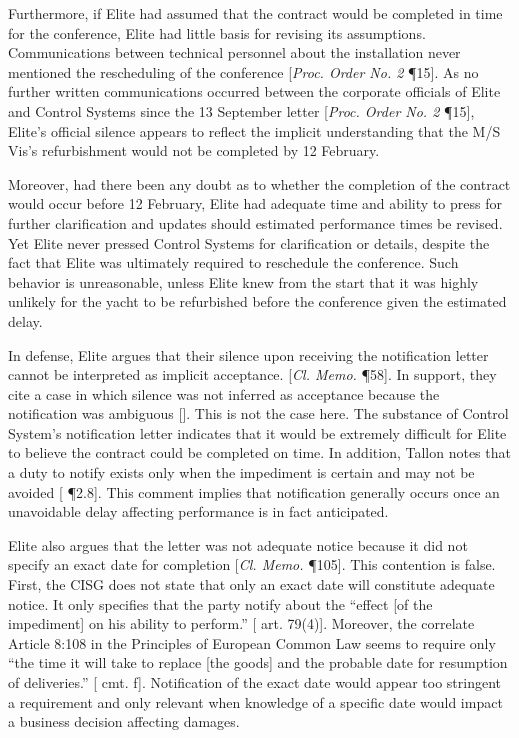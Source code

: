 Furthermore, if Elite had assumed that the contract would be completed in time for the conference, Elite had little basis for revising its assumptions. Communications between technical personnel about the installation never mentioned the rescheduling of the conference [\textit{Proc. Order No. 2} \P 15]. As no further written communications occurred between the corporate officials of Elite and Control Systems since the 13 September letter [\textit{Proc. Order No. 2} \P 15], Elite's official silence appears to reflect the implicit understanding that the M/S Vis's refurbishment would not be completed by 12 February. 

Moreover, had there been any doubt as to whether the completion of the contract would occur before 12 February, Elite had adequate time and ability to press for further clarification and updates should estimated performance times be revised. Yet Elite never pressed Control Systems for clarification or details, despite the fact that Elite was ultimately required to reschedule the conference. Such behavior is unreasonable, unless Elite knew from the start that it was highly unlikely for the yacht to be refurbished before the conference given the estimated delay. 

In defense, Elite argues that their silence upon receiving the notification letter cannot be interpreted as implicit acceptance. [\textit{Cl. Memo.} \P 58]. In support, they cite a case in which silence was not inferred as acceptance because the notification was ambiguous [\cite{Summer Cloth Case}]. This is not the case here. The substance of Control System's notification letter indicates that it would be extremely difficult for Elite to believe the contract could be completed on time. In addition, Tallon notes that a duty to notify exists only when the impediment is certain and may not be avoided [\cite{Tallon} \P 2.8]. This comment implies that notification generally occurs once an unavoidable delay affecting performance is in fact anticipated. 

Elite also argues that the letter was not adequate notice because it did not specify an exact date for completion [\textit{Cl. Memo.} \P 105]. This contention is false. First, the CISG does not state that only an exact date will constitute adequate notice. It only specifies that the party notify about the ``effect [of the impediment] on his ability to perform.'' [\cite{CISG} art. 79(4)]. Moreover, the correlate Article 8:108 in the Principles of European Common Law seems to require only ``the time it will take to replace [the goods] and the probable date for resumption of deliveries.'' [\cite{PECL} cmt. f]. Notification of the exact date would appear too stringent a requirement and only relevant when knowledge of a specific date would impact a business decision affecting damages. 

